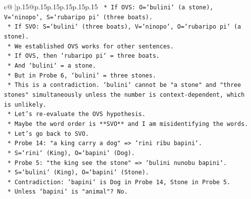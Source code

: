 \documentclass{article}
\begin{document}
{\begin{supertabular}{c@{$\;$}|p{.15\linewidth}@{}p{.15\linewidth}p{.15\linewidth}p{.15\linewidth}p{.15\linewidth}p{.15\linewidth}}
{{{\texttt{                                                    *   If OVS: O=`bulini` (a stone), V=`ninopo`, S=`rubaripo pi` (three boats).} \\
\texttt{                                                    *   If SVO: S=`bulini` (three boats), V=`ninopo`, O=`rubaripo pi` (a stone).} \\
\texttt{                                                    *   We established OVS works for other sentences.} \\
\texttt{                                                    *   If OVS, then `rubaripo pi` = three boats.} \\
\texttt{                                                    *   And `bulini` = a stone.} \\
\texttt{                                                    *   But in Probe 6, `bulini` = three stones.} \\
\texttt{                                                    *   This is a contradiction. `bulini` cannot be "a stone" and "three stones" simultaneously unless the number is context{-}dependent, which is unlikely.} \\
\texttt{                                                    *   Let's re{-}evaluate the OVS hypothesis.} \\
\texttt{                                                    *   Maybe the word order is **SVO** and I am misidentifying the words.} \\
\texttt{                                                    *   Let's go back to SVO.} \\
\texttt{                                                        *   Probe 14: "a king carry a dog" => `rini ribu bapini`.} \\
\texttt{                                                            *   S=`rini` (King), O=`bapini` (Dog).} \\
\texttt{                                                            *   Probe 5: "the king see the stone" => `bulini nunobu bapini`.} \\
\texttt{                                                                *   S=`bulini` (King), O=`bapini` (Stone).} \\
\texttt{                                                                *   Contradiction: `bapini` is Dog in Probe 14, Stone in Probe 5.} \\
\texttt{                                                                *   Unless `bapini` is "animal"? No.} \\
}}}
\end{supertabular}}
\end{document}
